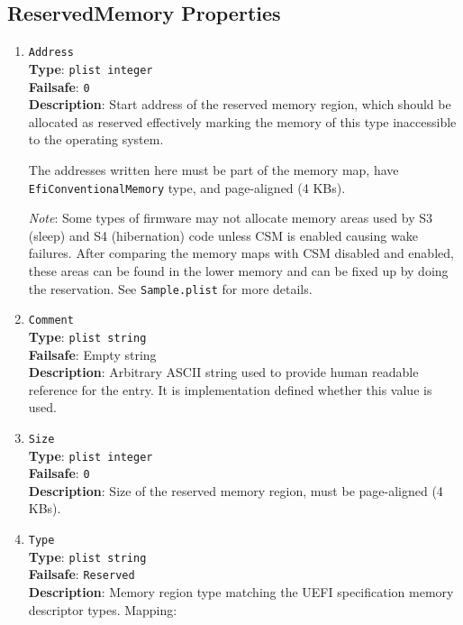 \documentclass[]{article}
\begin{document}
\subsection{ReservedMemory Properties}\label{uefirsvdprops}

\begin{enumerate}

\item
  \texttt{Address}\\
  \textbf{Type}: \texttt{plist\ integer}\\
  \textbf{Failsafe}: \texttt{0}\\
  \textbf{Description}: Start address of the reserved memory region, which should be allocated
  as reserved effectively marking the memory of this type inaccessible to the operating system.

  The addresses written here must be part of the memory map, have \texttt{EfiConventionalMemory}
  type, and page-aligned (4 KBs).

  \emph{Note}: Some types of firmware may not allocate memory areas used by S3 (sleep) and S4 (hibernation)
  code unless CSM is enabled causing wake failures. After comparing the memory maps with CSM disabled
  and enabled, these areas can be found in the lower memory and can be fixed up by doing the reservation.
  See \texttt{Sample.plist} for more details.

\item
  \texttt{Comment}\\
  \textbf{Type}: \texttt{plist\ string}\\
  \textbf{Failsafe}: Empty string\\
  \textbf{Description}: Arbitrary ASCII string used to provide human readable
  reference for the entry. It is implementation defined whether this value is
  used.

\item
  \texttt{Size}\\
  \textbf{Type}: \texttt{plist\ integer}\\
  \textbf{Failsafe}: \texttt{0}\\
  \textbf{Description}: Size of the reserved memory region, must be page-aligned (4 KBs).

\item
  \texttt{Type}\\
  \textbf{Type}: \texttt{plist\ string}\\
  \textbf{Failsafe}: \texttt{Reserved}\\
  \textbf{Description}: Memory region type matching the UEFI specification memory descriptor
  types. Mapping:


\end{enumerate}
\end{document}
